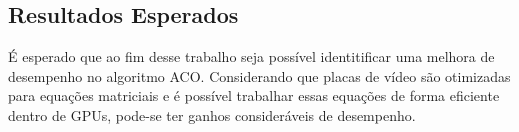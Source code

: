\subsection{Resultados Esperados}

É esperado que ao fim desse trabalho seja possível identitificar uma melhora de desempenho
no algoritmo ACO. Considerando que placas de vídeo são otimizadas para equações matriciais e
é possível trabalhar essas equações de forma eficiente dentro de GPUs, pode-se ter ganhos consideráveis
de desempenho. 